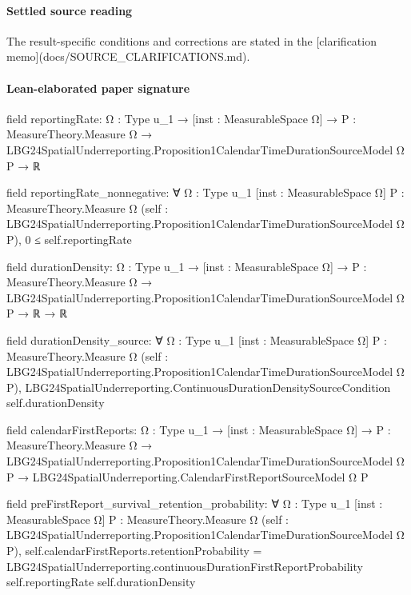 \documentclass[10pt]{article}
\begin{document}
\paragraph{Settled source reading}
\begin{sloppypar}
The result-\allowbreak{}specific conditions and corrections are stated in the [clarification memo](docs/\allowbreak{}SOURCE\_\allowbreak{}CLARIFICATIONS.\allowbreak{}md).\allowbreak{}
\end{sloppypar}

\paragraph{Lean-elaborated paper signature}
\begin{ReviewVerbatim}
field reportingRate:
{Ω : Type u_1} →
  [inst : MeasurableSpace Ω] →
    {P : MeasureTheory.Measure Ω} → LBG24SpatialUnderreporting.Proposition1CalendarTimeDurationSourceModel Ω P → ℝ

field reportingRate_nonnegative:
∀ {Ω : Type u_1} [inst : MeasurableSpace Ω] {P : MeasureTheory.Measure Ω}
  (self : LBG24SpatialUnderreporting.Proposition1CalendarTimeDurationSourceModel Ω P), 0 ≤ self.reportingRate

field durationDensity:
{Ω : Type u_1} →
  [inst : MeasurableSpace Ω] →
    {P : MeasureTheory.Measure Ω} → LBG24SpatialUnderreporting.Proposition1CalendarTimeDurationSourceModel Ω P → ℝ → ℝ

field durationDensity_source:
∀ {Ω : Type u_1} [inst : MeasurableSpace Ω] {P : MeasureTheory.Measure Ω}
  (self : LBG24SpatialUnderreporting.Proposition1CalendarTimeDurationSourceModel Ω P),
  LBG24SpatialUnderreporting.ContinuousDurationDensitySourceCondition self.durationDensity

field calendarFirstReports:
{Ω : Type u_1} →
  [inst : MeasurableSpace Ω] →
    {P : MeasureTheory.Measure Ω} →
      LBG24SpatialUnderreporting.Proposition1CalendarTimeDurationSourceModel Ω P →
        LBG24SpatialUnderreporting.CalendarFirstReportSourceModel Ω P

field preFirstReport_survival_retention_probability:
∀ {Ω : Type u_1} [inst : MeasurableSpace Ω] {P : MeasureTheory.Measure Ω}
  (self : LBG24SpatialUnderreporting.Proposition1CalendarTimeDurationSourceModel Ω P),
  self.calendarFirstReports.retentionProbability =
    LBG24SpatialUnderreporting.continuousDurationFirstReportProbability self.reportingRate self.durationDensity
\end{ReviewVerbatim}
\end{document}
